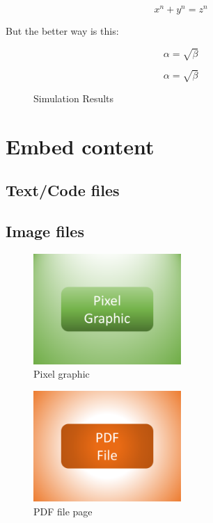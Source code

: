 \documentclass{article}				%
\begin{document}
$$x^n+y^n=z^n$$

But the better way is this:

\begin{equation}
\label{simple_equation}
\alpha = \sqrt{ \beta }
\end{equation}

\begin{equation}
\label{simple_equation}
\alpha = \sqrt{ \beta }
\end{equation}


\begin{figure}
    \centering
    \caption{Simulation Results}
    \label{simulationfigure}
\end{figure}

\newpage



\section{Embed content}

\subsection{Text/Code files}

\subsection{Image files}

\begin{figure}[ht]
	\centering
	\includegraphics[width=0.5\textwidth]{example-resource-pixel-graphic.png}
	\caption{Pixel graphic}
	\label{fig:pixelGraphic}
\end{figure}

\begin{figure}[ht]
	\centering
	\includegraphics[width=0.5\textwidth]{example-resource-pdf-file.pdf}
	\caption{PDF file page}
	\label{fig:pdfFile}
\end{figure}
\end{document}
